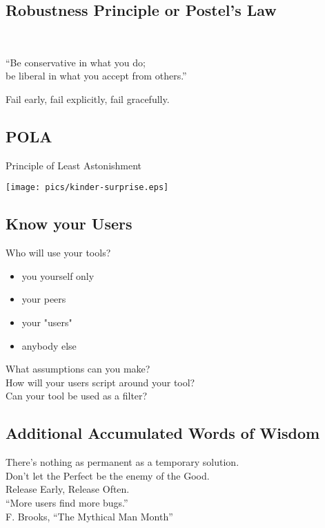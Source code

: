 \documentclass[xga]{xdvislides}
\begin{document}
\subsection{Robustness Principle or Postel's Law}
\\
\Huge
\begin{center}
	``Be conservative in what you do; \\
	be liberal in what you accept from others.''

\vspace{.5in}

Fail early, fail explicitly, fail gracefully.
\end{center}
\Normalsize


\subsection{POLA}
Principle of Least Astonishment
\\
\vspace*{\fill}
\begin{center}
	\texttt{[image: pics/kinder-surprise.eps]}
\end{center}
\vspace*{\fill}

\subsection{Know your Users}
Who will use your tools?
\begin{itemize}
	\item you yourself only
	\item your peers
	\item your "users"
	\item anybody else
\end{itemize}
\vspace{.5in}
What assumptions can you make? \\
How will your users script around your tool? \\
Can your tool be used as a filter?

\subsection{Additional Accumulated Words of Wisdom}
\Huge
\begin{center}
	There's nothing as permanent as a temporary solution. \\
\vspace{.5in}
	Don't let the Perfect be the enemy of the Good. \\
\vspace{.5in}
	Release Early, Release Often. \\
\Normalsize
	\addvspace{.2in}
	``More users find more bugs.'' \\
	\addvspace{.1in}
	\small F. Brooks, ``The Mythical Man Month''
\end{center}
\Normalsize
\end{document}
